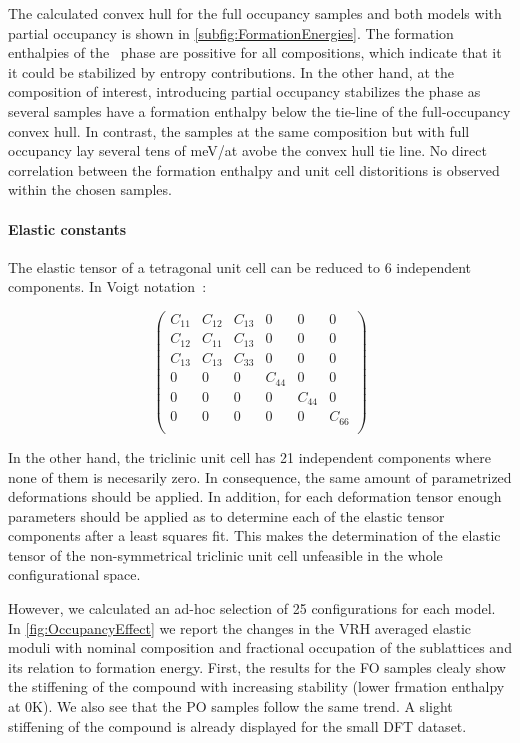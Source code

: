 \documentclass[superscriptaddress, 12pt]{revtex4-2}%
\begin{document}
The calculated convex hull for the full occupancy samples and both models with partial occupancy is shown in \autoref{subfig:FormationEnergies}. 
The formation enthalpies of the \textsigma~phase are possitive for all compositions, which indicate that it it could be stabilized by entropy contributions. 
In the other hand, at the composition of interest, introducing partial occupancy stabilizes the phase as several samples have a formation enthalpy below the tie-line of the full-occupancy convex hull. 
In contrast, the samples at the same composition but with full occupancy lay several tens of meV/at avobe the convex hull tie line.
No direct correlation between the formation enthalpy and unit cell distoritions is observed within the chosen samples.

\paragraph{Elastic constants}

The elastic tensor of a tetragonal unit cell can be reduced to 6 independent components.
In Voigt notation~\cite{golesorkhtabar_elastic_2013}:

\begin{equation}
  \begin{pmatrix}
    C_{11} & C_{12} & C_{13} & 0 & 0 & 0 \\
    C_{12} & C_{11} & C_{13} & 0 & 0 & 0 \\
    C_{13} & C_{13} & C_{33} & 0 & 0 & 0 \\
    0 & 0 & 0 & C_{44} & 0 & 0 \\
    0 & 0 & 0 & 0 & C_{44} & 0 \\
    0 & 0 & 0 & 0 & 0 & C_{66} \\
  \end{pmatrix}
\end{equation}

In the other hand, the triclinic unit cell has 21 independent components where none of them is necesarily zero. 
In consequence, the same amount of parametrized deformations should be applied.
In addition, for each deformation tensor enough parameters should be applied as to determine each of the elastic tensor components after a least squares fit.
This makes the determination of the elastic tensor of the non-symmetrical triclinic unit cell unfeasible in the whole configurational space.

 However, we calculated an ad-hoc selection of 25 configurations for each model. 
 In \autoref{fig:OccupancyEffect} we report the changes in the VRH averaged elastic moduli with nominal composition and fractional occupation of the sublattices and its relation to formation energy.
 First, the results for the FO samples clealy show the stiffening of the compound with increasing stability (lower frmation enthalpy at 0K).
 We also see that the PO samples follow the same trend.
 A slight stiffening of the compound is already displayed for the small DFT dataset.
\end{document}
